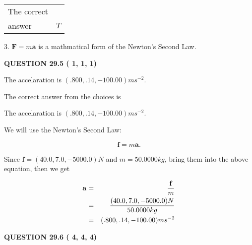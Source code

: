 \documentclass[12pt]{article}
\begin{document}
\noindent\begin{tabular}{|l|l|}\hline The correct & \\
          answer &  %
$T$ \\ \hline \end{tabular}
3.  %
$\mathbf{F}=m\mathbf{a}$ is a mathmatical form of  %
the Newton's Second Law.
 
 
 
  
\vspace{0.2in}
  
{\textbf{\Large{QUESTION
29.5 
 (          1,          1,          1)
}}}
  
  


 
 
\noindent{}
 
 
The accelaration is $  %
(
.800,
.14,
-100.00)
ms^{-2} $.
 
 
 
 
 
 
\noindent{}

The correct answer from the choices is


The accelaration is $  %
(
.800,
.14,
-100.00)
ms^{-2} $.
 
 
 
 
 
\noindent{}

We will use the Newton's Second Law:
 
\[
\mathbf{f}=m\mathbf{a}.
\]
 
Since $\mathbf{f}= %
(40.0 , 7.0 , -5000.0) N$
and $m= %
50.0000kg$, bring them into the above equation, then we get
 
\begin{eqnarray*}
\mathbf{a}&=&\frac{\mathbf{f}}m  \\
&=&\frac{ %
(40.0 , 7.0 , -5000.0) N}{ %
50.0000kg}  \\
&=& %
(.800 , .14 , -100.00) ms^{-2}
\end{eqnarray*}
 
 
 
  
\vspace{0.2in}
  
{\textbf{\Large{QUESTION
29.6 
 (          4,          4,          4)
}}}
  
\end{document}
